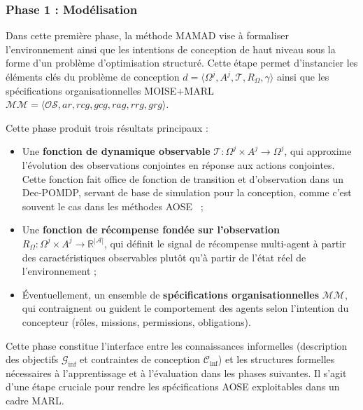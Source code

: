 

\subsubsection{Phase 1 : Modélisation}\label{sec:modelling}

Dans cette première phase, la méthode MAMAD vise à formaliser l'environnement ainsi que les intentions de conception de haut niveau sous la forme d'un problème d'optimisation structuré. Cette étape permet d'instancier les éléments clés du problème de conception $d = \langle \Omega^j, A^j, \mathcal{T}, R_{\Omega}, \gamma \rangle$ ainsi que les spécifications organisationnelles MOISE+MARL $\mathcal{MM} = \langle \mathcal{OS}, ar, rcg, gcg, rag, rrg, grg \rangle$.

Cette phase produit trois résultats principaux :

\begin{itemize}
    \item Une \textbf{fonction de dynamique observable} $\mathcal{T}: \Omega^j \times A^j \rightarrow \Omega^j$, qui approxime l'évolution des observations conjointes en réponse aux actions conjointes. Cette fonction fait office de fonction de transition et d'observation dans un Dec-POMDP, servant de base de simulation pour la conception, comme c'est souvent le cas dans les méthodes AOSE~\cite{Jamont2O15} ;
          
    \item Une \textbf{fonction de récompense fondée sur l'observation} $R_{\Omega}: \Omega^j \times A^j \rightarrow \mathbb{R}^{|\mathcal{A}|}$, qui définit le signal de récompense multi-agent à partir des caractéristiques observables plutôt qu'à partir de l'état réel de l'environnement ;
          
    \item Éventuellement, un ensemble de \textbf{spécifications organisationnelles} $\mathcal{MM}$, qui contraignent ou guident le comportement des agents selon l'intention du concepteur (rôles, missions, permissions, obligations).
\end{itemize}

Cette phase constitue l'interface entre les connaissances informelles (description des objectifs $\mathcal{G}_{\text{inf}}$ et contraintes de conception $\mathcal{C}_{\text{inf}}$) et les structures formelles nécessaires à l'apprentissage et à l'évaluation dans les phases suivantes. Il s'agit d'une étape cruciale pour rendre les spécifications AOSE exploitables dans un cadre MARL.

